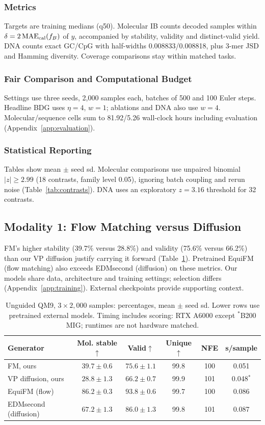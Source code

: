 \documentclass{article}
\begin{document}
\subsubsection{Metrics}
Targets are training medians (q50). Molecular IB counts decoded samples within $\delta=2\operatorname{MAE}_{\rm cal}(f_B)$ of $y$, accompanied by stability, validity and distinct-valid yield. DNA counts exact GC/CpG with half-widths 0.008833/0.008818, plus 3-mer JSD and Hamming diversity. Coverage comparisons stay within matched tasks.
\subsubsection{Fair Comparison and Computational Budget}
Settings use three seeds, 2,000 samples each, batches of 500 and 100 Euler steps. Headline BDG uses $\eta=4$, $w=1$; ablations and DNA also use $w=4$. Molecular/sequence cells sum to 81.92/5.26 wall-clock hours including evaluation (Appendix~\ref{app:evaluation}).
\subsubsection{Statistical Reporting}
Tables show mean $\pm$ seed sd. Molecular comparisons use unpaired binomial $|z|\ge2.99$ (18 contrasts, family level 0.05), ignoring batch coupling and rerun noise (Table~\ref{tab:contrasts}). DNA uses an exploratory $z=3.16$ threshold for 32 contrasts.

\subsection{Modality 1: Flow Matching versus Diffusion}\label{sec:fmvd}
FM's higher stability (39.7\% versus 28.8\%) and validity (75.6\% versus 66.2\%) than our VP diffusion justify carrying it forward (Table~\ref{tab:fmvd}). Pretrained EquiFM (flow matching) also exceeds EDMsecond (diffusion) on these metrics. Our models share data, architecture and training settings; selection differs (Appendix~\ref{app:training}). External checkpoints provide supporting context.
\begin{table}[!htbp]
\centering\small
\caption{Unguided QM9, $3\times2{,}000$ samples: percentages, mean $\pm$ seed sd. Lower rows use pretrained external models. Timing includes scoring: RTX A6000 except $^*$B200 MIG; runtimes are not hardware matched.}
\label{tab:fmvd}
\begin{tabular}{lccccc}
\toprule
Generator & Mol. stable$\uparrow$ & Valid$\uparrow$ & Unique$\uparrow$ & NFE & s/sample\\
\midrule
FM, ours & $39.7\pm0.6$ & $75.6\pm1.1$ & 99.8 & 100 & 0.051\\
VP diffusion, ours & $28.8\pm1.3$ & $66.2\pm0.7$ & 99.9 & 101 & 0.048$^{*}$\\
\midrule
EquiFM (flow) & $86.2\pm0.3$ & $93.8\pm0.6$ & 99.7 & 100 & 0.086\\
EDMsecond (diffusion) & $67.2\pm1.3$ & $86.0\pm1.3$ & 99.8 & 101 & 0.087\\
\bottomrule
\end{tabular}
\end{table}
\end{document}
